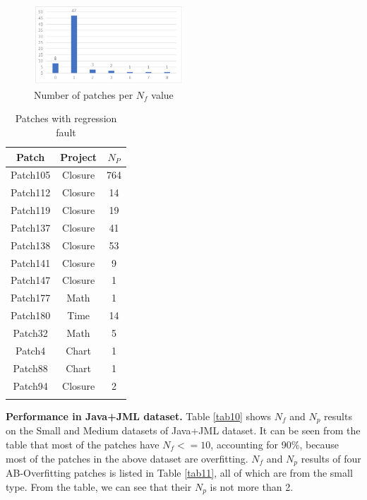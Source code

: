\documentclass[sn-basic]{sn-jnl}
\theoremstyle{thmstyleone}
\theoremstyle{thmstyletwo}
\theoremstyle{thmstylethree}
\begin{document}
\begin{figure}[ht]%
	\centering
	\includegraphics[width=0.5\textwidth]{fig9.png}
	\caption{Number of patches per $N_f$ value}\label{fig9}
\end{figure}

\begin{table}[ht]
	\begin{center}
		\begin{minipage}{173px}
			\caption{Patches with regression fault}\label{tab9}%
			\begin{tabular}{ccc}
				\toprule
				Patch & Project & $N_P$
				\\
				\midrule
				Patch105&	Closure&	764  \\
				Patch112&	Closure&	14     \\
				Patch119&	Closure&	19  \\
				Patch137&	Closure&	41  \\
			Patch138	&Closure&	53	\\
			Patch141&	Closure&	9	\\
			Patch147&	Closure&	1	\\
			Patch177&	Math&	1	\\
			Patch180&	Time&	14\\
		    Patch32	 &   Math&	5\\
	    	Patch4	  &  Chart&	1	\\
			Patch88	   & Chart&	1\\
			Patch94	    &Closure&	2\\
				\botrule
			\end{tabular}
		\end{minipage}
	\end{center}
\end{table}

\textbf{Performance in Java+JML dataset.} Table \ref{tab10} shows $N_f$ and $N_p$ results on the Small and Medium datasets of Java+JML dataset. It can be seen from the table that most of the patches have $N_f < = 10$, accounting for 90$\%$, because most of the patches in the above dataset are overfitting. $N_f$ and $N_p$ results of four AB-Overfitting patches is listed in Table \ref{tab11}, all of which are from the small type. From the table, we can see that their $N_p$ is not more than 2.
\end{document}
